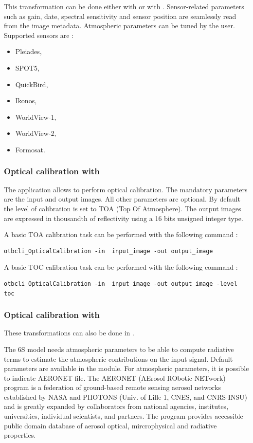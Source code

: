 This transformation can be done either with \app or with
\mont. Sensor-related parameters such as gain, date, spectral
sensitivity and sensor position are seamlessly read from the image
metadata. Atmospheric parameters can be tuned by the user. Supported
sensors are :
\begin{itemize}
\item Pleiades,
\item SPOT5,
\item QuickBird,
\item Ikonos,
\item WorldView-1,
\item WorldView-2,
\item Formosat.
\end{itemize}

\subsubsection{Optical calibration with \app}

The  application
allows to perform optical calibration. The mandatory
parameters are the input and output images. All other parameters are
optional. By default the level of calibration is set to TOA (Top Of 
Atmosphere).  The output images are expressed in thousandth of 
reflectivity using a 16 bits unsigned integer type.

A basic TOA calibration task can be performed with the following command :

\begin{verbatim}
otbcli_OpticalCalibration -in  input_image -out output_image
\end{verbatim}

A basic TOC calibration task can be performed with the following command :

\begin{verbatim}
otbcli_OpticalCalibration -in  input_image -out output_image -level toc
\end{verbatim}

\subsubsection{Optical calibration with \mont}

These transformations can also be done in \mont.

The 6S model needs atmospheric parameters to be able to compute
radiative terms to estimate the atmospheric contributions on the input
signal. Default parameters are available in the module.  For
atmospheric parameters, it is possible to indicate AERONET file. The
AERONET (AErosol RObotic NETwork) program is a federation of
ground-based remote sensing aerosol networks established by NASA and
PHOTONS (Univ. of Lille 1, CNES, and CNRS-INSU) and is greatly
expanded by collaborators from national agencies, institutes,
universities, individual scientists, and partners. The program
provides accessible public domain database of aerosol optical,
mircrophysical and radiative properties.

